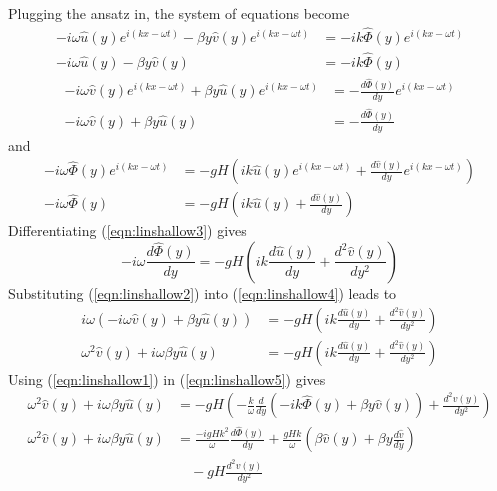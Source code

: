 \begin{solution}
Plugging the ansatz in, the system of equations become
\begin{align}
-i\omega \hat{u}(y) e^{i(kx-\omega t)} - \beta y \hat{v}(y)e^{i(kx-\omega t)} &= -i k \hat{\Phi}(y)e^{i(kx-\omega t)} \nonumber\\
-i\omega \hat{u}(y) - \beta y \hat{v}(y) &= -i k \hat{\Phi}(y) \label{eqn:linshallow1}
\end{align}
\begin{align}
-i\omega \hat{v}(y)e^{i(kx-\omega t)} + \beta y \hat{u}(y)e^{i(kx-\omega t)} &= -\frac{d\hat{\Phi}(y)}{dy}e^{i(kx-\omega t)} \nonumber\\
-i\omega \hat{v}(y) + \beta y \hat{u}(y) &= -\frac{d\hat{\Phi}(y)}{dy} \label{eqn:linshallow2}
\end{align}
and
\begin{align}
-i\omega \hat{\Phi}(y)e^{i(kx-\omega t)} &= - gH\left(i k\hat{u}(y)e^{i(kx-\omega t)} + \frac{d\hat{v}(y)}{dy}e^{i(kx-\omega t)}\right) \nonumber\\
-i\omega \hat{\Phi}(y) &= - gH(i k\hat{u}(y) + \frac{d\hat{v}(y)}{dy}) \label{eqn:linshallow3} 
\end{align}
Differentiating (\ref{eqn:linshallow3}) gives
\begin{equation}
-i\omega \frac{d\hat{\Phi}(y)}{dy} = - gH(i k\frac{d\hat{u}(y)}{dy} + \frac{d^2\hat{v}(y)}{dy^2}) \label{eqn:linshallow4}      
\end{equation}
Substituting (\ref{eqn:linshallow2}) into (\ref{eqn:linshallow4}) leads to
\begin{align}
i\omega (-i\omega \hat{v}(y) + \beta y \hat{u}(y)) &= - gH(i k\frac{d\hat{u}(y)}{dy} + \frac{d^2\hat{v}(y)}{dy^2}) \nonumber \\
\omega^2 \hat{v}(y) + i \omega\beta y \hat{u}(y) &= - gH(i k\frac{d\hat{u}(y)}{dy} + \frac{d^2\hat{v}(y)}{dy^2}) \label{eqn:linshallow5}   
\end{align}
Using (\ref{eqn:linshallow1}) in (\ref{eqn:linshallow5}) gives
\begin{align}
\omega^2 \hat{v}(y) + i \omega\beta y \hat{u}(y) &= -gH(-\frac{k}{\omega} \frac{d}{dy} (-i k \hat{\Phi}(y) + \beta y\hat{v}(y)) + \frac{d^2\hat{v}(y)}{dy^2}) \nonumber \\
\omega^2 \hat{v}(y) + i \omega\beta y \hat{u}(y) &= 
\frac{-i gHk^2}{\omega}\frac{d\hat{\Phi}(y)}{dy} + \frac{gHk}{\omega}(\beta\hat{v}(y) + \beta y\frac{d\hat{v}}{dy}) \nonumber \\ 
&\quad- gH \frac{d^2\hat{v}(y)}{dy^2}   \label{eqn:linshallow6}   

\end{align}
\end{solution}
